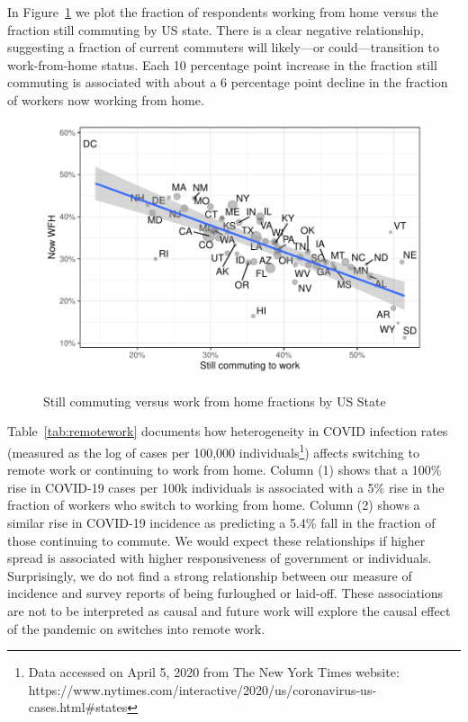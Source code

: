 \documentclass[12pt]{article}
\begin{document}
In Figure~\ref{fig:commute_vs_wfh} we plot the fraction of respondents working from home versus the fraction still commuting by US state.
There is a clear negative relationship, suggesting a fraction of current commuters will likely---or could---transition to work-from-home status.
Each 10 percentage point increase in the fraction still commuting is associated with about a 6 percentage point decline in the fraction of workers now working from home. 

\begin{figure}
  \caption{Still commuting versus work from home fractions by US State} \label{fig:commute_vs_wfh}
\centering
\begin{minipage}{0.8 \linewidth}
  \includegraphics[width = \linewidth]{plots/commute_vs_wfh.pdf} \\
  \begin{footnotesize}
    \end{footnotesize}
\end{minipage}
\end{figure} 

Table~\ref{tab:remotework} documents how heterogeneity in COVID infection rates (measured as the log of cases per 100,000 individuals\footnote{Data accessed on April 5, 2020 from The New York Times website: https://www.nytimes.com/interactive/2020/us/coronavirus-us-cases.html\#states}) affects switching to remote work or continuing to work from home. Column (1) shows that a 100\% rise in COVID-19 cases per 100k individuals is associated with a 5\% rise in the fraction of workers who switch to working from home. Column (2) shows a similar rise in COVID-19 incidence as predicting a 5.4\% fall in the fraction of those continuing to commute. We would expect these relationships if higher spread is associated with higher responsiveness of government or individuals. Surprisingly, we do not find a strong relationship between our measure of incidence and survey reports of being furloughed or laid-off. These associations are not to be interpreted as causal and future work will explore the causal effect of the pandemic on switches into remote work.
\end{document}
